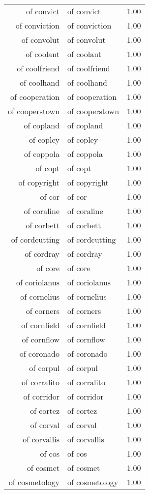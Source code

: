 \begin{table}[ht]
\begin{tabular}{rlr}
  of convict & of convict & 1.00 \\ 
  of conviction & of conviction & 1.00 \\ 
  of convolut & of convolut & 1.00 \\ 
  of coolant & of coolant & 1.00 \\ 
  of coolfriend & of coolfriend & 1.00 \\ 
  of coolhand & of coolhand & 1.00 \\ 
  of cooperation & of cooperation & 1.00 \\ 
  of cooperstown & of cooperstown & 1.00 \\ 
  of copland & of copland & 1.00 \\ 
  of copley & of copley & 1.00 \\ 
  of coppola & of coppola & 1.00 \\ 
  of copt & of copt & 1.00 \\ 
  of copyright & of copyright & 1.00 \\ 
  of cor & of cor & 1.00 \\ 
  of coraline & of coraline & 1.00 \\ 
  of corbett & of corbett & 1.00 \\ 
  of cordcutting & of cordcutting & 1.00 \\ 
  of cordray & of cordray & 1.00 \\ 
  of core & of core & 1.00 \\ 
  of coriolanus & of coriolanus & 1.00 \\ 
  of cornelius & of cornelius & 1.00 \\ 
  of corners & of corners & 1.00 \\ 
  of cornfield & of cornfield & 1.00 \\ 
  of cornflow & of cornflow & 1.00 \\ 
  of coronado & of coronado & 1.00 \\ 
  of corpul & of corpul & 1.00 \\ 
  of corralito & of corralito & 1.00 \\ 
  of corridor & of corridor & 1.00 \\ 
  of cortez & of cortez & 1.00 \\ 
  of corval & of corval & 1.00 \\ 
  of corvallis & of corvallis & 1.00 \\ 
  of cos & of cos & 1.00 \\ 
  of cosmet & of cosmet & 1.00 \\ 
  of cosmetology & of cosmetology & 1.00 \\ 

\end{tabular}
\end{table}
